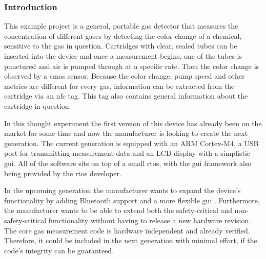 \subsubsection{Introduction}
This example project is a general, portable gas detector that measures the concentration of different gases by detecting the color change of a chemical, sensitive to the gas in question. Cartridges with clear, sealed tubes can be inserted into the device and once a measurement begins, one of the tubes is punctured and air is pumped through at a specific rate. Then the color change is observed by a \acrshort{cmos} sensor. Because the color change, pump speed and other metrics are different for every gas, information can be extracted from the cartridge via an \acrshort{nfc} tag. This tag also contains general information about the cartridge in question.

In this thought experiment the first version of this device has already been on the market for some time and now the manufacturer is looking to create the next generation. The current generation is equipped with an ARM Cortex-M4, a USB port for transmitting measurement data and an LCD display with a simplistic \acrshort{gui}. All of the software sits on top of a small \acrshort{rtos}, with the \acrshort{gui} framework also being provided by the \acrshort{rtos} developer.

In the upcoming generation the manufacturer wants to expand the device's functionality by adding Bluetooth support and a more flexible \acrshort{gui} . Furthermore, the manufacturer wants to be able to extend both the safety-critical and non-safety-critical functionality without having to release a new hardware revision. The core gas measurement code is hardware independent and already verified. Therefore, it could be included in the next generation with minimal effort, if the code's integrity can be guaranteed.
